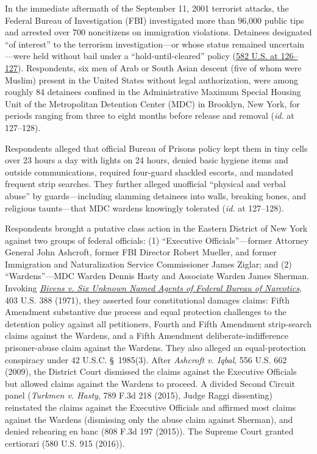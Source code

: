 \documentclass[12pt]{article}
\begin{document}
In the immediate aftermath of the September 11, 2001 terrorist attacks, the Federal Bureau of Investigation (FBI) investigated more than 96,000 public tips and arrested over 700 noncitizens on immigration violations. Detainees designated ``of interest'' to the terrorism investigation---or whose status remained uncertain---were held without bail under a ``hold-until-cleared'' policy (\href{https://www.law.cornell.edu/supremecourt/text/15-1358}{582 U.S. at 126--127}). Respondents, six men of Arab or South Asian descent (five of whom were Muslim) present in the United States without legal authorization, were among roughly 84 detainees confined in the Administrative Maximum Special Housing Unit of the Metropolitan Detention Center (MDC) in Brooklyn, New York, for periods ranging from three to eight months before release and removal (\textit{id.} at 127--128).

Respondents alleged that official Bureau of Prisons policy kept them in tiny cells over 23 hours a day with lights on 24 hours, denied basic hygiene items and outside communications, required four-guard shackled escorts, and mandated frequent strip searches. They further alleged unofficial ``physical and verbal abuse'' by guards---including slamming detainees into walls, breaking bones, and religious taunts---that MDC wardens knowingly tolerated (\textit{id.} at 127--128).

Respondents brought a putative class action in the Eastern District of New York against two groups of federal officials: (1) ``Executive Officials''---former Attorney General John Ashcroft, former FBI Director Robert Mueller, and former Immigration and Naturalization Service Commissioner James Ziglar; and (2) ``Wardens''---MDC Warden Dennis Hasty and Associate Warden James Sherman. Invoking \href{https://supreme.justia.com/cases/federal/us/403/388/}{\textit{Bivens v. Six Unknown Named Agents of Federal Bureau of Narcotics}}, 403 U.S. 388 (1971), they asserted four constitutional damages claims: Fifth Amendment substantive due process and equal protection challenges to the detention policy against all petitioners, Fourth and Fifth Amendment strip-search claims against the Wardens, and a Fifth Amendment deliberate-indifference prisoner-abuse claim against the Wardens. They also alleged an equal-protection conspiracy under 42 U.S.C. \S~1985(3). After \textit{Ashcroft v. Iqbal}, 556 U.S. 662 (2009), the District Court dismissed the claims against the Executive Officials but allowed claims against the Wardens to proceed. A divided Second Circuit panel (\textit{Turkmen v. Hasty}, 789 F.3d 218 (2015), Judge Raggi dissenting) reinstated the claims against the Executive Officials and affirmed most claims against the Wardens (dismissing only the abuse claim against Sherman), and denied rehearing en banc (808 F.3d 197 (2015)). The Supreme Court granted certiorari (580 U.S. 915 (2016)).
\end{document}
